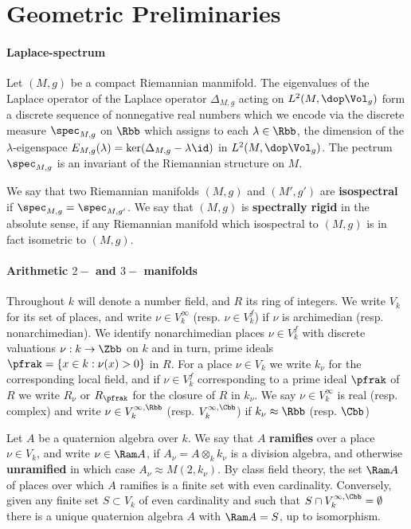 \section{Geometric Preliminaries}
\paragraph{Laplace-spectrum}
Let $(M,g)$ be a compact Riemannian manmifold. The eigenvalues of the Laplace operator of the Laplace operator $\Delta_{M,g}$ acting on $L^2(M,\dop \Vol_g)$ form a discrete sequence of nonnegative real numbers which we encode via the discrete measure $\spec_{M,g}$ on $\Rbb$ which assigns to each $\lambda \in \Rbb$, the dimension of the $\lambda$-eigenspace $E_{M,g}(\lambda)=\ker (\Delta_{M,g}- \lambda \id)$ in $L^2(M, \dop \Vol_g)$. The pectrum $\spec_{M,g}$ is an invariant of the Riemannian structure on $M$.

We say that two Riemannian manifolds $(M,g)$ and $(M',g')$ are \textbf{isospectral} if $\spec_{M,g} = \spec_{M,g'}$. We say that $(M,g)$ is \textbf{spectrally rigid} in the absolute sense, if any Riemannian manifold which isospectral to $(M,g)$ is in fact isometric to $(M,g)$.

\paragraph{Arithmetic $2-$ and $3-$ manifolds}
Throughout $k$ will denote a number field, and $R$ its ring of integers. We write $V_k$ for its set of places, and write $\nu \in V_k^\infty$ (resp. $\nu \in V_k^f$) if $\nu$ is archimedian (resp. nonarchimedian).
We identify nonarchimedian places $\nu \in V_k^f$ with discrete valuations $\nu : k \to \Zbb$ on $k$ and in turn, prime ideals $\pfrak = \{ x \in k: \nu(x) > 0\}$ in $R$.
For a place $\nu \in V_k$ we write $k_\nu$ for the corresponding local field, and if $\nu \in V_k^f$ corresponding to a prime ideal $\pfrak$ of $R$ we write $R_\nu$ or $R_\pfrak$ for the closure of $R$ in $k_\nu$.
We say $\nu \in V_k^\infty$ is real (resp. complex) and write $\nu \in V_k^{\infty,\Rbb}$ (resp. $V_k^{\infty,\Cbb}$) if $k_\nu \approx \Rbb$ (resp. $\Cbb$)

Let $A$ be a quaternion algebra over $k$. We say that $A$ \textbf{ramifies} over a place $\nu \in V_k$, and write $\nu \in \Ram A$, if $A_\nu = A \otimes_k k_\nu$ is a division algebra, and otherwise \textbf{unramified} in which case $A_\nu \approx M(2,k_\nu)$.
By class field theory, the set $\Ram A$ of places over which $A$ ramifies is a finite set with even cardinality. Conversely, given any finite set $S \subset V_k$ of even cardinality and such that $S\cap V_k^{\infty,\Cbb}=\emptyset$ there is a unique quaternion algebra $A$ with $\Ram A = S$, up to isomorphism.

